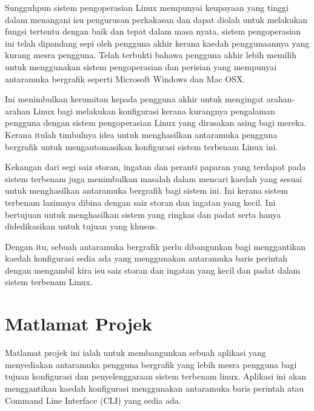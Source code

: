 Sungguhpun sistem pengoperasian Linux mempunyai keupayaan yang tinggi dalam menangani isu pengurusan perkakasan dan dapat diolah untuk melakukan fungsi tertentu dengan baik dan tepat dalam masa nyata, sistem pengoperasian ini telah dipandang sepi oleh pengguna akhir kerana kaedah penggunaannya yang kurang mesra pengguna. Telah terbukti bahawa pengguna akhir lebih memilih untuk menggunakan sistem pengoperasian dan perisian yang mempunyai antaramuka bergrafik seperti Microsoft Windows dan Mac OSX.

Ini menimbulkan kerumitan kepada pengguna akhir untuk mengingat arahan-arahan Linux bagi melakukan konfigurasi kerana kurangnya pengalaman pengguna dengan sistem pengoperasian Linux yang dirasakan asing bagi mereka. Kerana itulah timbulnya idea untuk menghasilkan antaramuka pengguna bergrafik untuk mengautomasikan konfigurasi sistem terbenam Linux ini.

Kekangan dari segi saiz storan, ingatan dan peranti paparan yang terdapat pada sistem terbenam juga menimbulkan masalah dalam mencari kaedah yang sesuai untuk menghasilkan antaramuka bergrafik bagi sistem ini. Ini kerana sistem terbenam lazimnya dibina dengan saiz storan dan ingatan yang kecil. Ini bertujuan untuk menghasilkan sistem yang ringkas dan padat serta hanya didedikasikan untuk tujuan yang khusus.

Dengan itu, sebuah antaramuka bergrafik perlu dibangunkan bagi menggantikan kaedah konfigurasi sedia ada yang menggunakan antaramuka baris perintah dengan mengambil kira isu saiz storan dan ingatan yang kecil dan padat dalam sistem terbenam Linux.

\section{Matlamat Projek}
Matlamat projek ini ialah untuk membangunkan sebuah aplikasi yang menyediakan antaramuka pengguna bergrafik yang lebih mesra pengguna bagi tujuan konfigurasi dan penyelenggaraan sistem terbenam linux. Aplikasi ini akan menggantikan kaedah konfigurasi menggunakan antaramuka baris perintah atau Command Line Interface (CLI) yang sedia ada.


